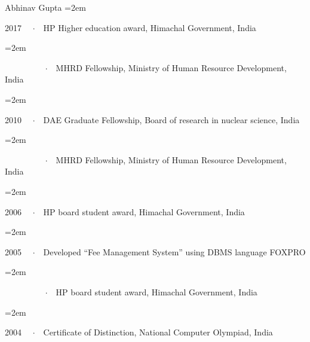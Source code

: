 \documentclass[  usegeometry%
]{scrartcl}
\newcommand{\Description}[1]{\hangindent=2em\hangafter=0\noindent\raggedright\footnotesize{#1}\par\normalsize\vspace{1em}} %
\begin{document}
\begin{cv}{{Abhinav Gupta}}
\Description{2017 \ \ $\cdotp$\ \ HP Higher education award, Himachal Government, India}

\vspace{-0.5em} %

\Description{~~~~~~~ \ \ $\cdotp$\ \ MHRD Fellowship, Ministry of Human Resource Development, India
}

\vspace{-0.5em} %

\Description{2010 \ \ $\cdotp$\ \ DAE Graduate Fellowship, Board of research in nuclear science, India}

\vspace{-0.5em} %

\Description{~~~~~~~ \ \ $\cdotp$\ \ MHRD Fellowship, Ministry of Human Resource Development, India}

\vspace{-0.5em} %

\Description{2006 \ \ $\cdotp$\ \ HP board student award, Himachal Government, India}

\vspace{-0.5em} %

\Description{2005 \ \ $\cdotp$\ \ Developed “Fee Management System” using DBMS language FOXPRO}

\vspace{-0.5em} %

\Description{~~~~~~~ \ \ $\cdotp$\ \ HP board student award, Himachal Government, India}

\vspace{-0.5em} %

\Description{2004 \ \ $\cdotp$\ \ Certificate of Distinction, National Computer Olympiad, India}






\end{cv}
\end{document}
